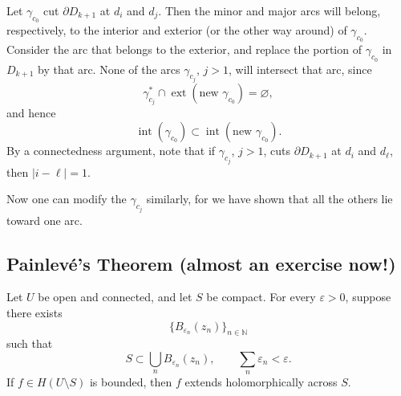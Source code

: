 \documentclass[11pt,a4paper]{article}
\begin{document}
Let $\gamma_{c_0}$ cut $\partial D_{k+1}$ at $d_i$ and $d_j$. Then the minor and major arcs will belong, respectively, to the interior and exterior (or the other way around) of $\gamma_{c_0}$. Consider the arc that belongs to the exterior, and replace the portion of $\gamma_{c_0}$ in $D_{k+1}$ by that arc. None of the arcs $\gamma_{c_j}$, $j>1$, will intersect that arc, since
\[
  \gamma_{c_j}^*\cap\operatorname{ext}(\text{new }\gamma_{c_0})=\varnothing,
\]
and hence
\[
  \operatorname{int}(\gamma_{c_0})
  \subset\operatorname{int}(\text{new }\gamma_{c_0}).
\]
By a connectedness argument, note that if $\gamma_{c_j}$, $j>1$, cuts $\partial D_{k+1}$ at $d_i$ and $d_\ell$, then $|i-\ell|=1$.


Now one can modify the $\gamma_{c_j}$ similarly, for we have shown that all the others lie toward one arc.


\subsection*{Painlev\'e's Theorem (almost an exercise now!)}

Let $U$ be open and connected, and let $S$ be compact. For every $\varepsilon>0$, suppose there exists
\[
  \{B_{\varepsilon_n}(z_n)\}_{n\in\mathbb N}
\]
such that
\[
  S\subset\bigcup_nB_{\varepsilon_n}(z_n),
  \qquad
  \sum_n\varepsilon_n<\varepsilon.
\]
If $f\in H(U\setminus S)$ is bounded, then $f$ extends holomorphically across $S$.
\end{document}
